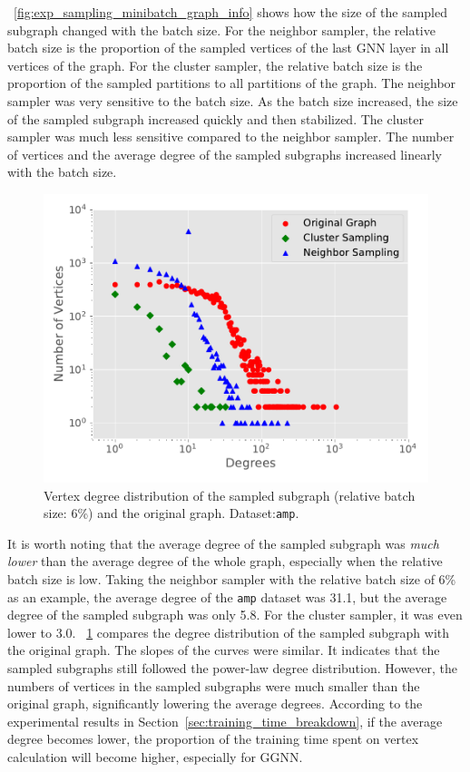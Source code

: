 \figurename~\ref{fig:exp_sampling_minibatch_graph_info} shows how the size of the sampled subgraph changed with the batch size.
For the neighbor sampler, the relative batch size is the proportion of the sampled vertices of the last GNN layer in all vertices of the graph.
For the cluster sampler, the relative batch size is the proportion of the sampled partitions to all partitions of the graph.
The neighbor sampler was very sensitive to the batch size.
As the batch size increased, the size of the sampled subgraph increased quickly and then stabilized.
The cluster sampler was much less sensitive compared to the neighbor sampler.
The number of vertices and the average degree of the sampled subgraphs increased linearly with the batch size.

\begin{figure}
    \centering
    \includegraphics[width=0.4\columnwidth]{figs/experiments/exp_sampling_minibatch_degrees_distribution_amazon-photo.pdf}
    \caption{Vertex degree distribution of the sampled subgraph (relative batch size: 6\%) and the original graph. Dataset:\texttt{amp}.}
    \label{fig:exp_sampling_minibatch_degrees_distribution}
\end{figure}

It is worth noting that the average degree of the sampled subgraph was \emph{much lower} than the average degree of the whole graph, especially when the relative batch size is low.
Taking the neighbor sampler with the relative batch size of 6\% as an example, the average degree of the \texttt{amp} dataset was 31.1, but the average degree of the sampled subgraph was only 5.8.
For the cluster sampler, it was even lower to 3.0.
\figurename~\ref{fig:exp_sampling_minibatch_degrees_distribution} compares the degree distribution of the sampled subgraph with the original graph.
The slopes of the curves were similar.
It indicates that the sampled subgraphs still followed the power-law degree distribution.
However, the numbers of vertices in the sampled subgraphs were much smaller than the original graph, significantly lowering the average degrees.
According to the experimental results in Section~\ref{sec:training_time_breakdown}, if the average degree becomes lower, the proportion of the training time spent on vertex calculation will become higher, especially for GGNN.

